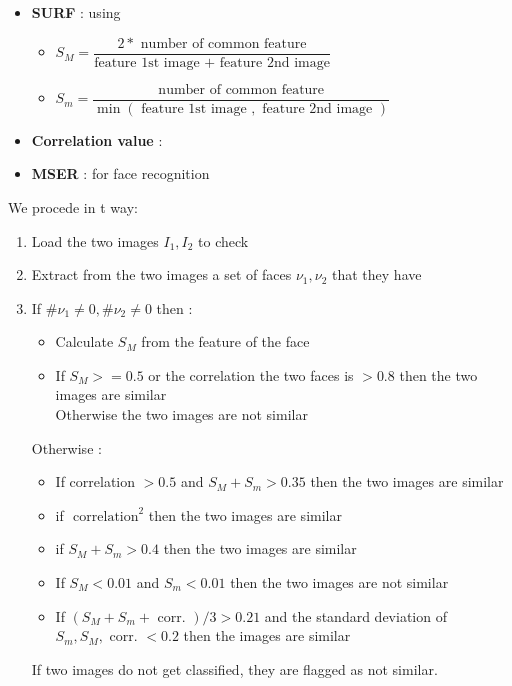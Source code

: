 \documentclass[10pt, journal,twocolumn]{IEEEtran}
\begin{document}
\begin{itemize}
  \item \textbf{SURF} : using
  \begin{itemize}
    \item $S_M = \dfrac{2*\text{ number of common feature}}{\text{feature 1st image } + \text{ feature 2nd image}}$ 
    \item $S_m = \dfrac{\text{number of common feature}}{\min(\text{ feature 1st image } , \text{ feature 2nd image })}$ 
  \end{itemize}
  \item \textbf{Correlation value} : 
  \item \textbf{MSER} : for face recognition 
\end{itemize}

We procede in t way:

\begin{enumerate}
  \item Load the two images $I_1 , I_2$ to check
  \item Extract from the two images a set of faces $ \nu_1 , \nu_2 $ that they have
  \item If $\#\nu_1 \neq 0 , \#\nu_2 \neq 0$ then :
    \begin{itemize}
      \item Calculate $S_M$ from the feature of the face
      \item If $S_M >= 0.5$ or the correlation the two faces is $> 0.8$ then the two images are similar\\
      Otherwise the two images are not similar
    \end{itemize}
    Otherwise :
    \begin{itemize}
      \item If correlation $> 0.5$ and $S_M + S_m > 0.35$ then the two images are similar\\
      \item if $\text{ correlation}^2$ then the two images are similar\\
      \item if $S_M + S_m > 0.4$ then the two images are similar
      \item If $S_M <0.01$ and $S_m < 0.01$ then the two images are not similar
      \item If $(S_M + S_m + \text{ corr. })/3 > 0.21$ and the standard deviation of $S_m, S_M, \text{ corr. } <0.2$ then the images are similar
    \end{itemize}
    If two images do not get classified, they are flagged as not similar.
\end{enumerate}
\end{document}
